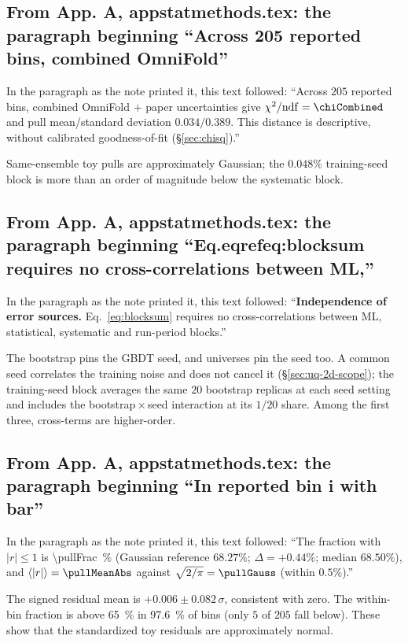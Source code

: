 \subsection{From App. A, appstatmethods.tex: the paragraph beginning ``Across 205 reported bins, combined OmniFold''}
In the paragraph as the note printed it, this text followed: ``Across $205$ reported bins, combined OmniFold $+$ paper uncertainties give $\chi^{2}/\mathrm{ndf} = \chiCombined$ and pull mean/standard deviation $0.034/0.389$. This distance is descriptive, without calibrated goodness-of-fit (\S\ref{sec:chisq}).''\par
Same-ensemble toy pulls are approximately Gaussian; the $0.048\%$ training-seed block is more than an order of magnitude below the systematic block.

\subsection{From App. A, appstatmethods.tex: the paragraph beginning ``Eq.eqrefeq:blocksum requires no cross-correlations between ML,''}
In the paragraph as the note printed it, this text followed: ``\textbf{Independence of error sources.} Eq.~\eqref{eq:blocksum} requires no cross-correlations between ML, statistical, systematic and run-period blocks.''\par
The bootstrap pins the GBDT seed, and universes pin the seed too. A common seed correlates the training noise and does not cancel it (\S\ref{sec:uq-2d-scope}); the training-seed block averages the same $20$ bootstrap replicas at each seed setting and includes the bootstrap\,$\times$\,seed interaction at its $1/20$ share. Among the first three, cross-terms are higher-order.

\subsection{From App. A, appstatmethods.tex: the paragraph beginning ``In reported bin i with bar''}
In the paragraph as the note printed it, this text followed: ``The fraction with $|r|\le1$ is \SI{\pullFrac}{\percent} (Gaussian reference $68.27\%$; $\Delta = +0.44\%$; median $68.50\%$), and $\langle|r|\rangle=\pullMeanAbs$ against $\sqrt{2/\pi}=\pullGauss$ (within $0.5\%$).''\par
The signed residual mean is $+0.006 \pm 0.082\,\sigma$, consistent with zero. The within-bin fraction is above \SI{65}{\percent} in \SI{97.6}{\percent} of bins (only $5$ of $205$ fall below). These show that the standardized toy residuals are approximately normal.

